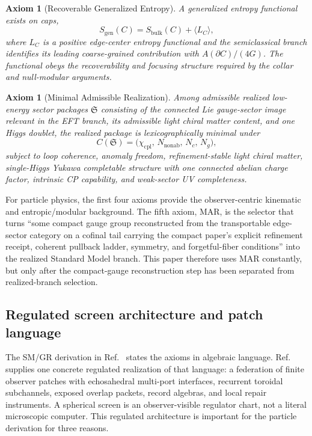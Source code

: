\documentclass[11pt]{article}
\newtheorem{axiom}[theorem]{Axiom}
\begin{document}
\begin{axiom}[Recoverable Generalized Entropy]\label{ax:entropy}
A generalized entropy functional exists on caps,
\[
S_{\mathrm{gen}}(C)=S_{\mathrm{bulk}}(C)+\langle L_C\rangle,
\]
where \(L_C\) is a positive edge-center entropy functional and the semiclassical branch
identifies its leading coarse-grained contribution with \(A(\partial C)/(4G)\). The functional
obeys the recoverability and focusing structure required by the collar and null-modular
arguments.
\end{axiom}

\begin{axiom}[Minimal Admissible Realization]\label{ax:mar}
Among admissible realized low-energy sector packages \(\mathfrak S\) consisting of the connected
Lie gauge-sector image relevant in the EFT branch, its admissible light chiral matter content,
and one Higgs doublet, the realized package is lexicographically minimal under
\[
C(\mathfrak S)=\bigl(\chi_{\mathrm{cpl}},\,N_{\mathrm{nonab}},\,N_c,\,N_g\bigr),
\]
subject to loop coherence, anomaly freedom, refinement-stable light chiral matter,
single-Higgs Yukawa completable structure with one connected abelian charge factor, intrinsic
CP capability, and weak-sector UV completeness.
\end{axiom}

For particle physics, the first four axioms provide the observer-centric kinematic and
entropic/modular background. The fifth axiom, MAR, is the selector that turns ``some compact
gauge group reconstructed from the transportable edge-sector category on a cofinal tail carrying
the compact paper's explicit refinement receipt, coherent pullback ladder, symmetry, and
forgetful-fiber conditions'' into the realized Standard Model branch. This
paper therefore uses MAR constantly, but only after the compact-gauge reconstruction step has
been separated from realized-branch selection.

\subsection{Regulated screen architecture and patch language}

The SM/GR derivation in Ref.~\cite{ophcompact}
states the axioms in algebraic language. Ref.~\cite{ophmicrophysics} supplies one concrete
regulated realization of that language: a federation of finite observer patches with echosahedral
multi-port interfaces, recurrent toroidal subchannels, exposed overlap packets, record algebras,
and local repair instruments. A spherical screen is an observer-visible regulator chart, not a
literal microscopic computer. This regulated architecture is important for the particle derivation
for three reasons.
\end{document}
